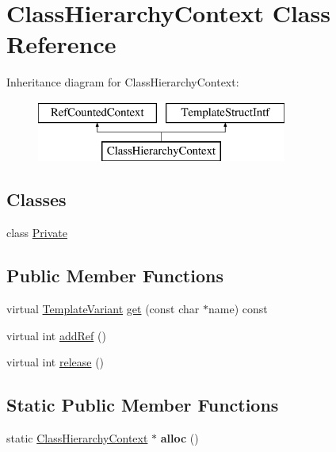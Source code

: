 \hypertarget{class_class_hierarchy_context}{}\section{Class\+Hierarchy\+Context Class Reference}
\label{class_class_hierarchy_context}
Inheritance diagram for Class\+Hierarchy\+Context\+:\begin{figure}[H]
\begin{center}
\leavevmode
\includegraphics[height=2.000000cm]{class_class_hierarchy_context}
\end{center}
\end{figure}
\subsection*{Classes}
\begin{DoxyCompactItemize}
\item 
class \mbox{\hyperlink{class_class_hierarchy_context_1_1_private}{Private}}
\end{DoxyCompactItemize}
\subsection*{Public Member Functions}
\begin{DoxyCompactItemize}
\item 
virtual \mbox{\hyperlink{class_template_variant}{Template\+Variant}} \mbox{\hyperlink{class_class_hierarchy_context_aac62b85d0f11f149612cd42891e94f07}{get}} (const char $\ast$name) const
\item 
virtual int \mbox{\hyperlink{class_class_hierarchy_context_a3140454536d10f2fed6b11f911a8eb0a}{add\+Ref}} ()
\item 
virtual int \mbox{\hyperlink{class_class_hierarchy_context_a96c1871a3b349869f62b6c5d1e36759f}{release}} ()
\end{DoxyCompactItemize}
\subsection*{Static Public Member Functions}
\begin{DoxyCompactItemize}
\item 
\mbox{\label{class_class_hierarchy_context_afa4af242d04fb32a80cd4802ea44b6b3}} 
static \mbox{\hyperlink{class_class_hierarchy_context}{Class\+Hierarchy\+Context}} $\ast$ {\bfseries alloc} ()
\end{DoxyCompactItemize}


